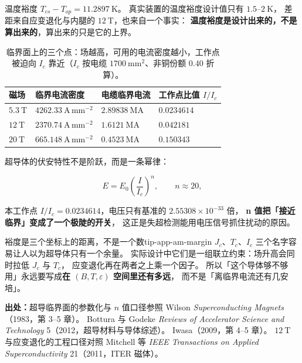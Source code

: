 温度裕度 $T_{cs}-T_{op}=11.2897\ \mathrm{K}$。
真实装置的温度裕度设计值只有 $1.5$--$2\ \mathrm{K}$，
差距来自应变退化与内腿的 $12\ \mathrm{T}$，也来自一个事实：
\textbf{温度裕度是设计出来的，不是算出来的}，算出来的只是它的上界。

\begin{table}[htbp]
\centering
\small
\caption{临界面上的三个点：场越高，可用的电流密度越小，工作点被迫向 $I_c$ 靠近（$I_c$ 按电缆 $1700\ \mathrm{mm^{2}}$、非铜份额 $0.40$ 折算）。}
\label{tab:app-am-critical}
\begin{tabular}{p{2.6cm}p{3.4cm}p{3.2cm}p{3.2cm}}
\toprule
磁场 & 临界电流密度 & 电缆临界电流 & 工作点比值 $I/I_c$ \\
\midrule
$5.3\ \mathrm{T}$ & $4262.33\ \mathrm{A\,mm^{-2}}$ & $2.89838\ \mathrm{MA}$ & $0.0234614$ \\
$12\ \mathrm{T}$ & $2370.74\ \mathrm{A\,mm^{-2}}$ & $1.6121\ \mathrm{MA}$ & $0.042181$ \\
$20\ \mathrm{T}$ & $665.148\ \mathrm{A\,mm^{-2}}$ & $0.4523\ \mathrm{MA}$ & $0.150343$ \\
\bottomrule
\end{tabular}

\end{table}

超导体的伏安特性不是阶跃，而是一条幂律：

\begin{equation}
E=E_0\left(\frac{I}{I_c}\right)^{n},
\qquad n\approx20,
\label{eq:app-am-nvalue}
\end{equation}

本工作点 $I/I_c=0.0234614$，电压只有基准的 $2.55308\times10^{-33}$ 倍，
\textbf{n 值把「接近临界」变成了一个极陡的开关}，
这正是失超检测能用电压信号抓住扰动的原因。

\begin{tip}{裕度是三个坐标上的距离，不是一个数}{tip-app-am-margin}
$J_c$、$T_c$、$I_c$ 三个名字容易让人以为超导体只有一个余量。
实际设计中它们是一组联立约束：场升高会同时拉低 $J_c$ 与 $T_c$，
应变退化再在两者之上乘一个因子。
所以「这个导体够不够用」永远要写成\textbf{在 $(B,T,\varepsilon)$ 空间里还有多远}，
而不是「离临界电流还有几安培」。
\end{tip}

{\footnotesize
\textbf{出处：}超导临界面的参数化与 $n$ 值口径参照 Wilson \emph{Superconducting Magnets}（1983，第 3--5 章）。
Bottura 与 Godeke \emph{Reviews of Accelerator Science and Technology} 5（2012，超导材料与导体综述）。
Iwasa（2009，第 4--5 章）。
$12\ \mathrm{T}$ 与应变退化的工程口径对照 Mitchell 等 \emph{IEEE Transactions on Applied Superconductivity} 21（2011，ITER 磁体）。
}

